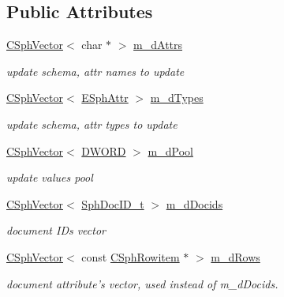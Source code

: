 \subsection*{Public Attributes}
\begin{DoxyCompactItemize}
\item 
\hyperlink{classCSphVector}{C\-Sph\-Vector}$<$ char $\ast$ $>$ \hyperlink{structCSphAttrUpdate_af6b87e1c9492c7707aca93213cf18f3a}{m\-\_\-d\-Attrs}
\begin{DoxyCompactList}\small\item\em update schema, attr names to update \end{DoxyCompactList}\item 
\hyperlink{classCSphVector}{C\-Sph\-Vector}$<$ \hyperlink{sphinxexpr_8h_aa883df0db2e4468a107fdd2d2ae625a3}{E\-Sph\-Attr} $>$ \hyperlink{structCSphAttrUpdate_ae07327b4cd589b53e96bf2e0661dbf7f}{m\-\_\-d\-Types}
\begin{DoxyCompactList}\small\item\em update schema, attr types to update \end{DoxyCompactList}\item 
\hyperlink{classCSphVector}{C\-Sph\-Vector}$<$ \hyperlink{sphinxstd_8h_a798af1e30bc65f319c1a246cecf59e39}{D\-W\-O\-R\-D} $>$ \hyperlink{structCSphAttrUpdate_a074812eb96b6877e46858109c08090ca}{m\-\_\-d\-Pool}
\begin{DoxyCompactList}\small\item\em update values pool \end{DoxyCompactList}\item 
\hyperlink{classCSphVector}{C\-Sph\-Vector}$<$ \hyperlink{sphinx_8h_a3176771631c12a9e4897272003e6b447}{Sph\-Doc\-I\-D\-\_\-t} $>$ \hyperlink{structCSphAttrUpdate_af80514672c2da7d0310044485e67375c}{m\-\_\-d\-Docids}
\begin{DoxyCompactList}\small\item\em document I\-Ds vector \end{DoxyCompactList}\item 
\hyperlink{classCSphVector}{C\-Sph\-Vector}$<$ const \hyperlink{sphinx_8h_a6a2df0f05f3397df8b6e230fda6f852f}{C\-Sph\-Rowitem} $\ast$ $>$ \hyperlink{structCSphAttrUpdate_af109ebce3bcb683624821fef41f430e3}{m\-\_\-d\-Rows}
\begin{DoxyCompactList}\small\item\em document attribute's vector, used instead of m\-\_\-d\-Docids. \end{DoxyCompactList}\item 

\end{DoxyCompactItemize}
